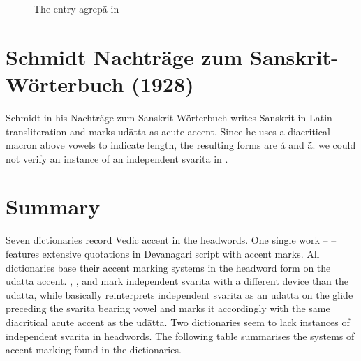 \begin{figure}[!ht]
\begin{center}
\end{center}
\caption[The entry agrepā́  in \citet{md}]{\label{fig:macdonnell-agrepA}The entry agrepā́ in \citet{md}}
\end{figure}

\section{Schmidt Nachträge zum Sanskrit-Wörterbuch (1928)}

Schmidt in his Nachträge zum Sanskrit-Wörterbuch \citep{sch} writes Sanskrit in Latin transliteration and marks udātta as acute accent. Since he uses a diacritical macron above vowels to indicate length, the resulting forms are á and ā́. we could not verify an instance of an independent svarita in \citet{sch}.

\section{Summary}

Seven dictionaries record Vedic accent in the headwords. One single work – \citet{pwg} – features extensive quotations in Devanagari script with accent marks. All dictionaries base their accent marking systems in the headword form on the udātta accent. \citet{pwg}, \citet{mw}, and \citet{ccs,cae} mark independent svarita with a different device than the udātta, while \citet{gra} basically reinterprets independent svarita as an udātta on the glide preceding the svarita bearing vowel and marks it accordingly with the same diacritical acute accent as the udātta. Two dictionaries \citep{md,sch} seem to lack instances of independent svarita in headwords. The following table summarises the systems of accent marking found in the dictionaries.

